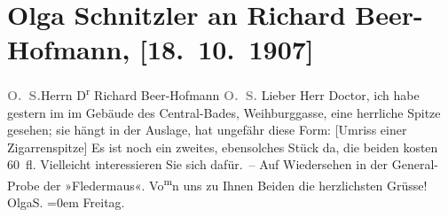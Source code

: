 

         
         \renewcommand{\erwaehntePersonen}{Personen: Richard Beer-Hofmann, Paula Beer-Hofmann, Heinrich Cubasch, Olga Schnitzler}
         \renewcommand{\erwaehnteInstitutionen}{Institutionen: Cabaret Fledermaus, Zentralbad}
         \renewcommand{\erwaehnteOrte}{Orte: Weihburggasse, Wien}
         \renewcommand{\erwaehnteWerke}{}
               \section[Olga Schnitzler an Richard Beer-Hofmann, {[}18. 10. 1907{]}]{ Olga Schnitzler an Richard Beer-Hofmann, {[}18. 10. 1907{]}}\nopagebreak{}\rehead{ }\begin{ledgroupsized}[t]{13cm}\normalsize\beginnumbering{} \toendnotes[C]{\smallbreak\pagebreak[2]} 
\toendnotes[C]{\smallbreak}\pstart{}{\pb}\textcolor{gray}{\textbf{O. S.}}\pend{}{\bigskip}\pstart{}{\pb}Herrn D\textsuperscript{r} Richard
                  Beer-Hofmann \pend{}{\bigskip}\pstart
           \noindent{}{\pb}\textcolor{gray}{\textbf{O. S.}}\pend
           \pstart
           Lieber Herr Doctor, ich habe gestern im \label{K_L01723-1v}\label{K_L01723-1h} im Gebäude des
                  Central-Bades, Weihburggasse, eine herrliche Spitze gesehen; sie hängt in
               der Auslage, hat ungefähr diese Form: {[}Umriss einer
                  Zigarrenspitze{]}\pend
           \pstart
           {\pb}Es ist noch ein zweites, ebensolches Stück da, die
               beiden kosten 60 fl. Vielleicht interessieren Sie sich dafür. – Auf Wiedersehen
                  \label{K_L01723-2v}\label{K_L01723-2h} in der General-Probe der »Fledermaus«.\pend
           \pstart
           Vo\substVorne{}\textsuperscript{m}\substDazwischen{}n\substHinten{} uns zu Ihnen Beiden
               die herzlichsten Grüsse!{\\[\baselineskip]}\spacefill\mbox{OlgaS.}\pend
           \leftskip=0em{}\pstart
           Freitag.\pend
           

\end{ledgroupsized}
